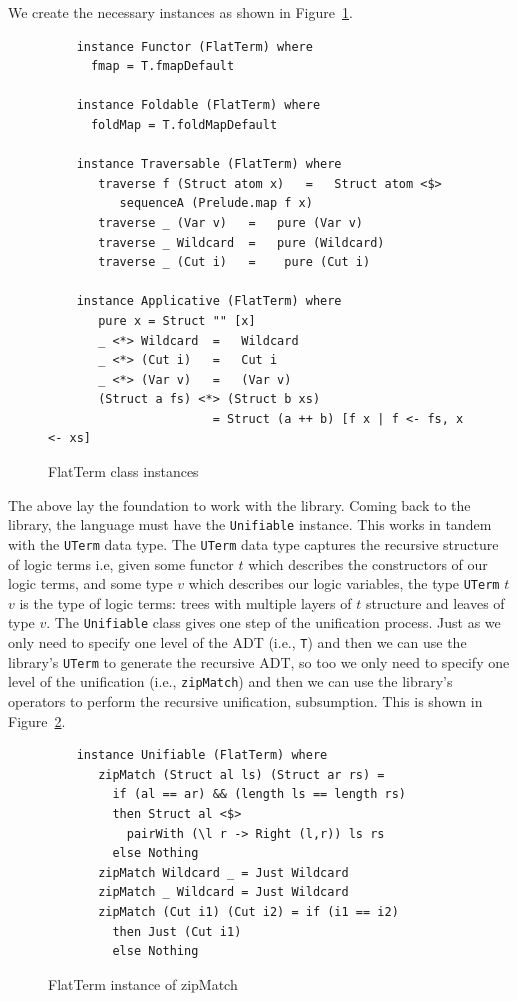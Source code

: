 \documentclass[thesis-solanki.tex]{subfiles}
\begin{document}
We create the necessary instances
as shown in Figure~\ref{tab:flat-term-class-inst}.
\begin{figure}
  \begin{verbatim}
    instance Functor (FlatTerm) where
      fmap = T.fmapDefault

    instance Foldable (FlatTerm) where
      foldMap = T.foldMapDefault

    instance Traversable (FlatTerm) where
       traverse f (Struct atom x)   =   Struct atom <$>
          sequenceA (Prelude.map f x)
       traverse _ (Var v)   =   pure (Var v)
       traverse _ Wildcard  =   pure (Wildcard)
       traverse _ (Cut i)   =    pure (Cut i)

    instance Applicative (FlatTerm) where
       pure x = Struct "" [x]
       _ <*> Wildcard  =   Wildcard
       _ <*> (Cut i)   =   Cut i
       _ <*> (Var v)   =   (Var v)
       (Struct a fs) <*> (Struct b xs)
                       = Struct (a ++ b) [f x | f <- fs, x <- xs]
  \end{verbatim}
  \caption{FlatTerm class instances}
  \label{tab:flat-term-class-inst}
\end{figure}

The above lay the foundation to work with the library.
Coming back to the library, the language must have the \Verb!Unifiable! instance.
This works in tandem with the \Verb!UTerm! data type.
The \Verb!UTerm! data type captures the recursive structure of logic terms i.e, given some functor \(t\) which describes the
constructors of our logic terms, and some type \(v\) which describes our logic variables, the type
\Verb!UTerm! \(t\) \(v\) is the
type of logic terms: trees with multiple layers of \(t\) structure and leaves of type \(v\).
The \Verb!Unifiable! class gives one step of the unification process.
Just as we only need to specify one level of the ADT (i.e., \Verb!T!) and then we can use the library's \Verb!UTerm! to generate
the recursive ADT, so too we only need to specify one level of the unification (i.e., \Verb!zipMatch!) and then we can use
the library's operators to perform the recursive unification, subsumption.
This is shown in Figure~\ref{tab:zipMatch}.
\begin{figure}
  \begin{verbatim}
    instance Unifiable (FlatTerm) where
       zipMatch (Struct al ls) (Struct ar rs) =
         if (al == ar) && (length ls == length rs)
         then Struct al <$>
           pairWith (\l r -> Right (l,r)) ls rs
         else Nothing
       zipMatch Wildcard _ = Just Wildcard
       zipMatch _ Wildcard = Just Wildcard
       zipMatch (Cut i1) (Cut i2) = if (i1 == i2)
         then Just (Cut i1)
         else Nothing
  \end{verbatim}
  \vspace*{-0.5\baselineskip}
  \caption{FlatTerm instance of zipMatch}
  \label{tab:zipMatch}
\end{figure}
\end{document}
